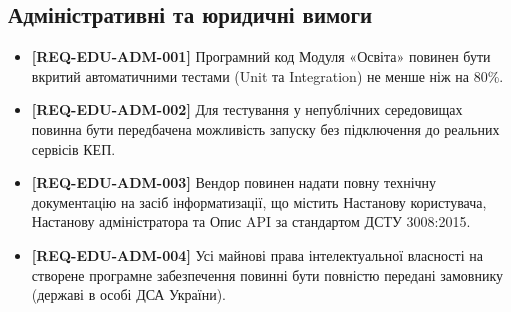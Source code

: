 \documentclass{article}
\begin{document}
\subsection{Адміністративні та юридичні вимоги}
\begin{itemize}
    \item \textbf{[REQ-EDU-ADM-001]} Програмний код Модуля «Освіта» повинен бути вкритий автоматичними тестами (Unit та Integration) не менше ніж на 80\%.
    \item \textbf{[REQ-EDU-ADM-002]} Для тестування у непублічних середовищах повинна бути передбачена можливість запуску без підключення до реальних сервісів КЕП.
    \item \textbf{[REQ-EDU-ADM-003]} Вендор повинен надати повну технічну документацію на засіб інформатизації, що містить Настанову користувача, Настанову адміністратора та Опис API за стандартом ДСТУ 3008:2015.
    \item \textbf{[REQ-EDU-ADM-004]} Усі майнові права інтелектуальної власності на створене програмне забезпечення повинні бути повністю передані замовнику (державі в особі ДСА України).
\end{itemize}
\end{document}

